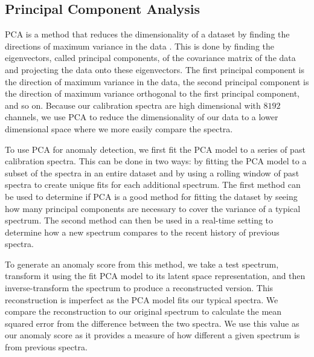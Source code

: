 \subsection{Principal Component Analysis}
PCA is a method that reduces the dimensionality of a dataset by finding the directions of maximum variance in the data \parencite{wold1987principal}.
This is done by finding the eigenvectors, called principal components, of the covariance matrix of the data and projecting the data onto these eigenvectors.
The first principal component is the direction of maximum variance in the data, the second principal component is the direction of maximum variance orthogonal to the first principal component, and so on.
Because our calibration spectra are high dimensional with $8192$ channels, we use PCA to reduce the dimensionality of our data to a lower dimensional space where we more easily compare the spectra.

To use PCA for anomaly detection, we first fit the PCA model to a series of past calibration spectra.
This can be done in two ways: by fitting the PCA model to a subset of the spectra in an entire dataset and by using a rolling window of past spectra to create unique fits for each additional spectrum. 
The first method can be used to determine if PCA is a good method for fitting the dataset by seeing how many principal components are necessary to cover the variance of a typical spectrum. 
The second method can then be used in a real-time setting to determine how a new spectrum compares to the recent history of previous spectra. 

To generate an anomaly score from this method, we take a test spectrum, transform it using the fit PCA model to its latent space representation, and then inverse-transform the spectrum to produce a reconstructed version. 
This reconstruction is imperfect as the PCA model fits our typical spectra.
We compare the reconstruction to our original spectrum to calculate the mean squared error from the difference between the two spectra. 
We use this value as our anomaly score as it provides a measure of how different a given spectrum is from previous spectra. 

